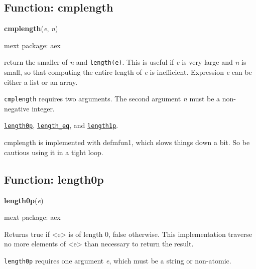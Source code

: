 \documentclass[]{article}
\begin{document}
\subsection{Function: cmplength\label{sec:cmplength}}
\hypertarget{cmplength}{}
{\bf cmplength}({\it e}, {\it n})


\noindent mext package: aex



\vspace{5 pt}
return the smaller of {\it n} and \verb#length(e)#. This is useful if {\it e} is very large and {\it n} is small, so that computing the entire length of {\it e} is inefficient. Expression {\it e} can be either a list or an array. 

\vspace{5 pt}

   {\tt cmplength} requires two arguments.
    The second argument {\it n} must be a non-negative integer.


\vspace{5 pt}


  \hyperlink{length0p}{{\tt length0p}}, \hyperlink{length_eq}{{\tt length\_eq}}, and \hyperlink{length1p}{{\tt length1p}}.

\vspace{5 pt}


cmplength is implemented with defmfun1, which slows things down a bit. So be cautious using it in a tight loop. 

\vspace{5 pt}


\subsection{Function: length0p\label{sec:length0p}}
\hypertarget{length0p}{}
{\bf length0p}({\it e})


\noindent mext package: aex



\vspace{5 pt}
Returns true if <e> is of length 0, false otherwise. This implementation traverse no more elements of <e> than necessary to return the result. 

\vspace{5 pt}

   {\tt length0p} requires one argument {\it e}, which must be a string or non-atomic.
\end{document}
